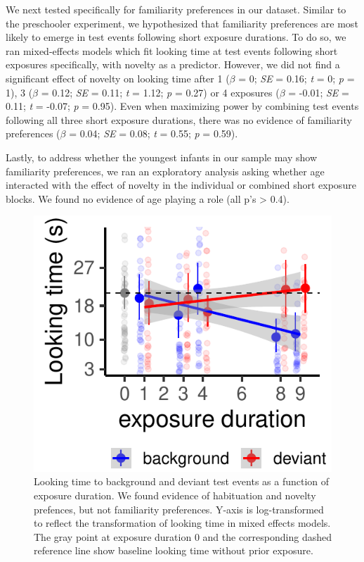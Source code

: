 \documentclass[10pt, letterpaper]{article}
\newenvironment{CodeChunk}{}{}
\begin{document}
We next tested specifically for familiarity preferences in our dataset.
Similar to the preschooler experiment, we hypothesized that familiarity
preferences are most likely to emerge in test events following short
exposure durations. To do so, we ran mixed-effects models which fit
looking time at test events following short exposures specifically, with
novelty as a predictor. However, we did not find a significant effect of
novelty on looking time after 1 (\(\beta\) = 0; \emph{SE} = 0.16;
\emph{t} = 0; \emph{p} = 1), 3 (\(\beta\) = 0.12; \emph{SE} = 0.11;
\emph{t} = 1.12; \emph{p} = 0.27) or 4 exposures (\(\beta\) = -0.01;
\emph{SE} = 0.11; \emph{t} = -0.07; \emph{p} = 0.95). Even when
maximizing power by combining test events following all three short
exposure durations, there was no evidence of familiarity preferences
(\(\beta\) = 0.04; \emph{SE} = 0.08; \emph{t} = 0.55; \emph{p} = 0.59).

Lastly, to address whether the youngest infants in our sample may show
familiarity preferences, we ran an exploratory analysis asking whether
age interacted with the effect of novelty in the individual or combined
short exposure blocks. We found no evidence of age playing a role (all
p's \textgreater{} 0.4).

\captionsetup{belowskip=45pt,aboveskip=4pt}

\begin{CodeChunk}
\begin{figure}[h]

\includegraphics{figs/infant_results-1} \hfill{}

\caption[Looking time to background and deviant test events as a function of exposure duration]{Looking time to background and deviant test events as a function of exposure duration. We found evidence of habituation and novelty prefences, but not familiarity preferences. Y-axis is log-transformed to reflect the transformation of looking time in mixed effects models. The gray point at exposure duration 0 and the corresponding dashed reference line show baseline looking time without prior exposure.}\label{fig:infant_results}
\end{figure}
\end{CodeChunk}
\end{document}
